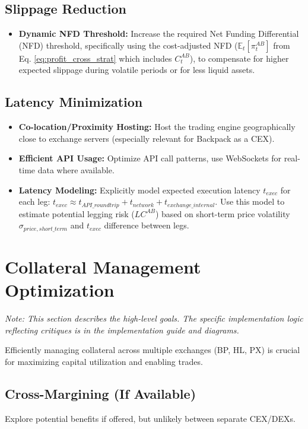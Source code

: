 \documentclass{article}
\begin{document}
\subsection{Slippage Reduction}

\begin{itemize}
    \item \textbf{Dynamic NFD Threshold:} Increase the required Net Funding Differential (NFD) threshold, specifically using the cost-adjusted NFD ($\mathbb{E}_t[\pi^{AB}_t]$ from Eq. \ref{eq:profit_cross_strat} which includes $C^{AB}_t$), to compensate for higher expected slippage during volatile periods or for less liquid assets.
\end{itemize}

\subsection{Latency Minimization}
\begin{itemize}
    \item \textbf{Co-location/Proximity Hosting:} Host the trading engine geographically close to exchange servers (especially relevant for Backpack as a CEX).
    \item \textbf{Efficient API Usage:} Optimize API call patterns, use WebSockets for real-time data where available.
    \item \textbf{Latency Modeling:} Explicitly model expected execution latency $t_{exec}$ for each leg: $t_{exec} \approx t_{API\_roundtrip} + t_{network} + t_{exchange\_internal}$. Use this model to estimate potential legging risk ($LC^{AB}$) based on short-term price volatility $\sigma_{price, short\_term}$ and $t_{exec}$ difference between legs.
\end{itemize}

\section{Collateral Management Optimization}
\textit{Note: This section describes the high-level goals. The specific implementation logic reflecting critiques is in the implementation guide and diagrams.}

Efficiently managing collateral across multiple exchanges (BP, HL, PX) is crucial for maximizing capital utilization and enabling trades.

\subsection{Cross-Margining (If Available)}
Explore potential benefits if offered, but unlikely between separate CEX/DEXs.
\end{document}
